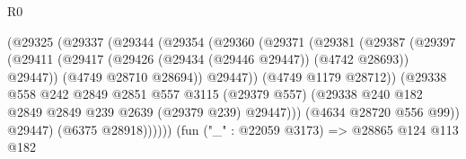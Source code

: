 \begin{lexlean}{R0}
\begin{coremodule}
                                        (@29325
                                          (@29337
                                            (@29344
                                              (@29354
                                                (@29360
                                                  (@29371
                                                    (@29381
                                                      (@29387
                                                        (@29397
                                                          (@29411
                                                            (@29417
                                                              (@29426
                                                                (@29434 (@29446 @29447))
                                                                (@4742 @28693))
                                                              @29447))
                                                          (@4749 @28710 @28694))
                                                        @29447))
                                                    (@4749 @1179 @28712))
                                                  (@29338
                                                    @558
                                                    @242
                                                    @2849
                                                    @2851
                                                    @557
                                                    @3115
                                                    (@29379 @557)
                                                    (@29338
                                                      @240
                                                      @182
                                                      @2849
                                                      @2849
                                                      @239
                                                      @2639
                                                      (@29379 @239)
                                                      @29447)))
                                                (@4634 @28720 @556 @99))
                                              @29447)
                                            (@6375 @28918))))))
                                  (fun ("_" : @22059 @3173) =>
                                  @28865
                                    @124
                                    @113
                                    @182

\end{coremodule}
\end{lexlean}
